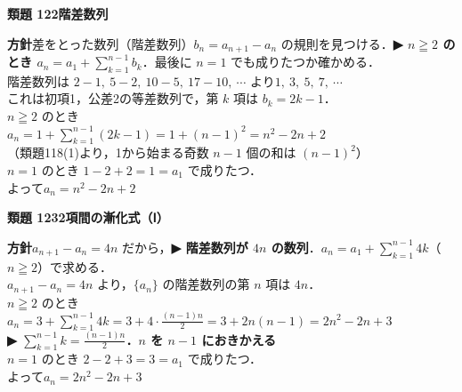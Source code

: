 \documentclass[a4paper,11pt]{ltjsarticle}
\newcommand{\ans}[2]{\Needspace{5\baselineskip}\vspace{6pt}%
  {\sffamily\bfseries 類題 #1\quad #2}\par}
\newcommand{\point}[1]{\textsf{\bfseries ▶ #1}}
\begin{document}
\ans{122}{階差数列}
\begin{kai}
\textbf{方針}\quad 差をとった数列（階差数列）$b_n=a_{n+1}-a_n$ の規則を見つける．\point{$n\geqq2$ のとき $a_n=a_1+\displaystyle\sum_{k=1}^{n-1}b_k$}．最後に $n=1$ でも成りたつか確かめる．\\[2pt]
階差数列は $2-1,\ 5-2,\ 10-5,\ 17-10,\ \cdots$ より\quad $1,\ 3,\ 5,\ 7,\ \cdots$\\
これは初項1，公差2の等差数列で，第 $k$ 項は $b_k=2k-1$．\\[2pt]
$n\geqq2$ のとき\\
\hspace*{1.5em}$a_n=1+\displaystyle\sum_{k=1}^{n-1}(2k-1)=1+(n-1)^2=n^2-2n+2$\\
\hspace*{1.5em}（類題118(1)より，1から始まる奇数 $n-1$ 個の和は $(n-1)^2$）\\
$n=1$ のとき $1-2+2=1=a_1$ で成りたつ．\\[2pt]
よって\quad $a_n=n^2-2n+2$
\end{kai}

\ans{123}{2項間の漸化式（Ⅰ）}
\begin{kai}
\textbf{方針}\quad $a_{n+1}-a_n=4n$ だから，\point{階差数列が $4n$ の数列}．$a_n=a_1+\displaystyle\sum_{k=1}^{n-1}4k$（$n\geqq2$）で求める．\\[2pt]
$a_{n+1}-a_n=4n$ より，$\{a_n\}$ の階差数列の第 $n$ 項は $4n$．\\
$n\geqq2$ のとき\\
\hspace*{1.5em}$a_n=3+\displaystyle\sum_{k=1}^{n-1}4k=3+4\cdot\frac{(n-1)n}2=3+2n(n-1)=2n^2-2n+3$\\
\hspace*{1.5em}\point{$\displaystyle\sum_{k=1}^{n-1}k=\frac{(n-1)n}2$．$n$ を $n-1$ におきかえる}\\
$n=1$ のとき $2-2+3=3=a_1$ で成りたつ．\\[2pt]
よって\quad $a_n=2n^2-2n+3$
\end{kai}
\end{document}
